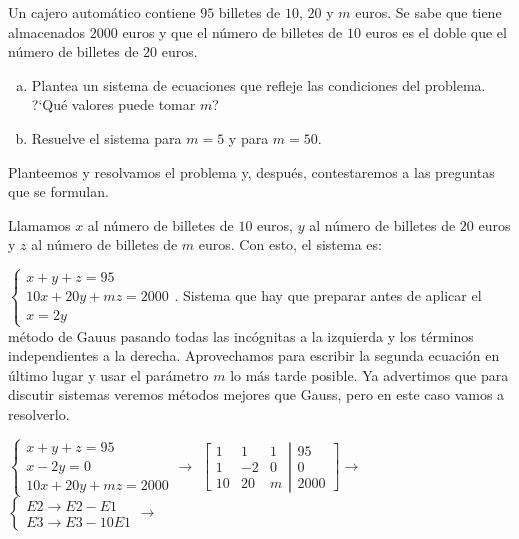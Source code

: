 \begin{ejre} 
Un cajero automático contiene $95$ billetes de $10$, $20$ y $m$ euros. Se sabe que tiene almacenados $2000$ euros y que el número de billetes de $10$ euros es el doble que el número de billetes de $20$ euros. 

\begin{enumerate}[a) ]
\item Plantea un sistema de ecuaciones que refleje las condiciones del problema. ?`Qué valores puede tomar $m$?
\item Resuelve el sistema para $m=5$ y para  $m = 50$. 
\end{enumerate} 
\end{ejre}
\begin{proofw}\renewcommand{\qedsymbol}{$\diamond$}
Planteemos y resolvamos el problema y, después, contestaremos a las preguntas que se formulan.

Llamamos $x$ al número de billetes de $10$ euros, $y$ al número de billetes de $20$ euros y $z$ al número de billetes de $m$ euros. Con esto, el sistema es:

\noindent $\begin{cases}x+y+z=95\\10x+20y+mz=2000\\x=2y  \end{cases}$. Sistema que hay que preparar antes de aplicar el método de Gauus pasando todas las incógnitas a la izquierda y los términos independientes a la derecha. Aprovechamos para escribir la segunda ecuación en último lugar y usar el parámetro $m$ lo más tarde posible. Ya advertimos que para discutir sistemas veremos métodos mejores que Gauss, pero en este caso vamos a resolverlo.

\noindent $\begin{cases}x+y+z=95 \\x-2y=0 \\10x+20y+mz=2000  \end{cases} \to $
$\left[ \begin{matrix}
  1 & 1 & 1 \\ 1 & -2 & 0 \\ 10 & 20 & m 
 \end{matrix}\right. 
 \left| \begin{matrix}
  95 \\ 0 \\ 2000 
 \end{matrix}\right] \to $
\textcolor{gris}{ $ \begin{cases} E2 \to E2-E1 \\ E3 \to E3-10E1 \end{cases} \to $}


\end{proofw}
